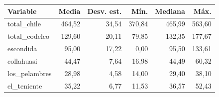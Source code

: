 \begin{tabular}{lrrrrr}
\toprule
Variable & Media & Desv. est. & Mín. & Mediana & Máx. \\
\midrule
total\_chile & 464,52 & 34,54 & 370,84 & 465,99 & 563,60 \\
total\_codelco & 129,60 & 20,11 & 79,85 & 132,35 & 177,67 \\
escondida & 95,00 & 17,22 & 0,00 & 95,50 & 133,61 \\
collahuasi & 44,47 & 7,64 & 16,98 & 44,49 & 60,32 \\
los\_pelambres & 28,98 & 4,58 & 14,00 & 29,40 & 38,10 \\
el\_teniente & 35,22 & 6,77 & 11,53 & 36,57 & 52,43 \\
\bottomrule
\end{tabular}
